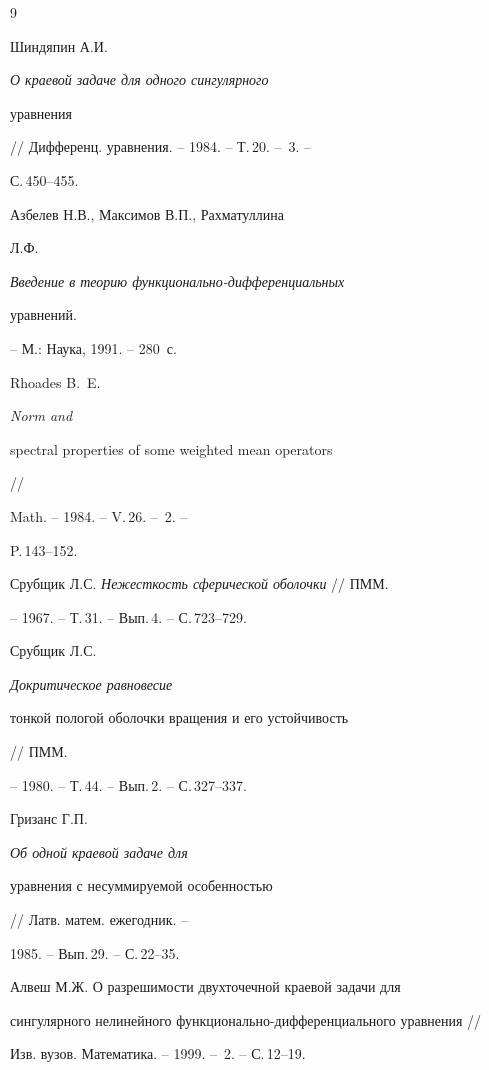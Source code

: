\begin{thebibliography}{9}







Шиндяпин А.И. {\em О краевой задаче для одного сингулярного


уравнения} // Дифференц. уравнения. -- 1984. -- Т.\,20. -- \No\,3. --


С.\,450--455.







Азбелев Н.В., Максимов В.П., Рахматуллина


Л.Ф. {\em Введение в теорию функционально-дифференциальных


уравнений.} -- М.: Наука, 1991. -- 280~с.







Rhoades B.~E. {\em Norm and


spectral properties of some weighted mean operators} //


Math. -- 1984. -- V.\,26. -- \No\,2. --


P.\,143--152.




Срубщик Л.С. {\em Нежесткость сферической оболочки} // ПММ.


-- 1967. -- Т.\,31. -- Вып.\,4. -- С.\,723--729.




Срубщик Л.С. {\em Докритическое равновесие


тонкой пологой оболочки вращения и его устойчивость} // ПММ.


-- 1980. -- Т.\,44. -- Вып.\,2. -- С.\,327--337.




Гризанс Г.П. {\em Об одной краевой задаче для


уравнения с несуммируемой особенностью} // Латв. матем. ежегодник. --


1985. -- Вып.\,29. -- С.\,22--35.




Алвеш М.Ж. О разрешимости двухточечной краевой задачи для


сингулярного нелинейного функционально-дифференциального уравнения //


Изв. вузов. Математика. -- 1999. -- \No\,2. -- С.\,12--19.





\end{thebibliography}





\vskip 2cm









\label{end}














